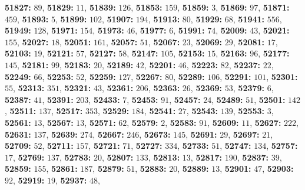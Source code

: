 \textsf{\bfseries 51827:} $89$, \textsf{\bfseries 51829:} $11$, \textsf{\bfseries 51839:} $126$, \textsf{\bfseries 51853:} $159$, \textsf{\bfseries 51859:} $3$, \textsf{\bfseries 51869:} $97$, \textsf{\bfseries 51871:} $459$, \textsf{\bfseries 51893:} $5$, \textsf{\bfseries 51899:} $102$, \textsf{\bfseries 51907:} $194$, \textsf{\bfseries 51913:} $80$, \textsf{\bfseries 51929:} $68$, \textsf{\bfseries 51941:} $556$, \textsf{\bfseries 51949:} $128$, \textsf{\bfseries 51971:} $154$, \textsf{\bfseries 51973:} $46$, \textsf{\bfseries 51977:} $6$, \textsf{\bfseries 51991:} $74$, \textsf{\bfseries 52009:} $43$, \textsf{\bfseries 52021:} $155$, \textsf{\bfseries 52027:} $18$, \textsf{\bfseries 52051:} $161$, \textsf{\bfseries 52057:} $51$, \textsf{\bfseries 52067:} $23$, \textsf{\bfseries 52069:} $29$, \textsf{\bfseries 52081:} $17$, \textsf{\bfseries 52103:} $19$, \textsf{\bfseries 52121:} $57$, \textsf{\bfseries 52127:} $58$, \textsf{\bfseries 52147:} $105$, \textsf{\bfseries 52153:} $15$, \textsf{\bfseries 52163:} $96$, \textsf{\bfseries 52177:} $145$, \textsf{\bfseries 52181:} $99$, \textsf{\bfseries 52183:} $20$, \textsf{\bfseries 52189:} $42$, \textsf{\bfseries 52201:} $46$, \textsf{\bfseries 52223:} $82$, \textsf{\bfseries 52237:} $22$, \textsf{\bfseries 52249:} $66$, \textsf{\bfseries 52253:} $52$, \textsf{\bfseries 52259:} $127$, \textsf{\bfseries 52267:} $80$, \textsf{\bfseries 52289:} $106$, \textsf{\bfseries 52291:} $101$, \textsf{\bfseries 52301:} $55$, \textsf{\bfseries 52313:} $351$, \textsf{\bfseries 52321:} $43$, \textsf{\bfseries 52361:} $206$, \textsf{\bfseries 52363:} $26$, \textsf{\bfseries 52369:} $53$, \textsf{\bfseries 52379:} $6$, \textsf{\bfseries 52387:} $41$, \textsf{\bfseries 52391:} $203$, \textsf{\bfseries 52433:} $7$, \textsf{\bfseries 52453:} $91$, \textsf{\bfseries 52457:} $24$, \textsf{\bfseries 52489:} $51$, \textsf{\bfseries 52501:} $142$, \textsf{\bfseries 52511:} $137$, \textsf{\bfseries 52517:} $353$, \textsf{\bfseries 52529:} $184$, \textsf{\bfseries 52541:} $27$, \textsf{\bfseries 52543:} $139$, \textsf{\bfseries 52553:} $3$, \textsf{\bfseries 52561:} $13$, \textsf{\bfseries 52567:} $13$, \textsf{\bfseries 52571:} $62$, \textsf{\bfseries 52579:} $2$, \textsf{\bfseries 52583:} $91$, \textsf{\bfseries 52609:} $11$, \textsf{\bfseries 52627:} $222$, \textsf{\bfseries 52631:} $137$, \textsf{\bfseries 52639:} $274$, \textsf{\bfseries 52667:} $246$, \textsf{\bfseries 52673:} $145$, \textsf{\bfseries 52691:} $29$, \textsf{\bfseries 52697:} $21$, \textsf{\bfseries 52709:} $52$, \textsf{\bfseries 52711:} $157$, \textsf{\bfseries 52721:} $71$, \textsf{\bfseries 52727:} $334$, \textsf{\bfseries 52733:} $51$, \textsf{\bfseries 52747:} $134$, \textsf{\bfseries 52757:} $17$, \textsf{\bfseries 52769:} $137$, \textsf{\bfseries 52783:} $20$, \textsf{\bfseries 52807:} $133$, \textsf{\bfseries 52813:} $13$, \textsf{\bfseries 52817:} $190$, \textsf{\bfseries 52837:} $39$, \textsf{\bfseries 52859:} $155$, \textsf{\bfseries 52861:} $187$, \textsf{\bfseries 52879:} $51$, \textsf{\bfseries 52883:} $20$, \textsf{\bfseries 52889:} $13$, \textsf{\bfseries 52901:} $47$, \textsf{\bfseries 52903:} $92$, \textsf{\bfseries 52919:} $19$, \textsf{\bfseries 52937:} $48$, 
